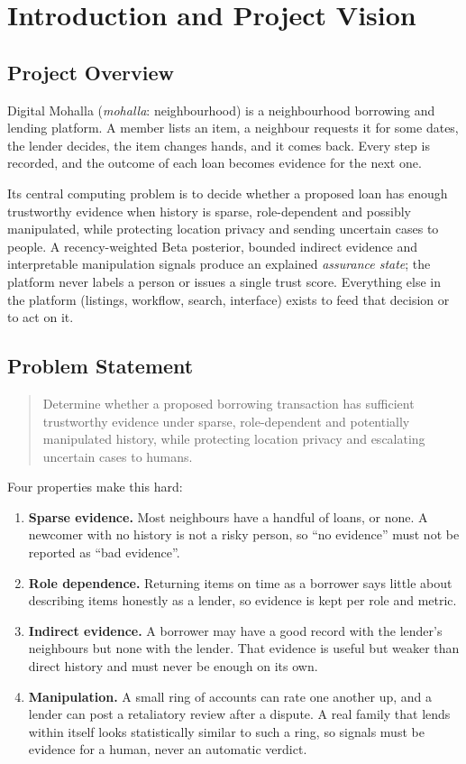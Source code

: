 \chapter{Introduction and Project Vision}\label{ch:introduction-project-vision}
\section{Project Overview}\label{sec:project-overview}
Digital Mohalla (\textit{mohalla}: neighbourhood) is a neighbourhood borrowing and lending platform. A member lists an item, a neighbour requests it for some dates, the lender decides, the item changes hands, and it comes back. Every step is recorded, and the outcome of each loan becomes evidence for the next one.

Its central computing problem is to decide whether a proposed loan has enough trustworthy evidence when history is sparse, role-dependent and possibly manipulated, while protecting location privacy and sending uncertain cases to people. A recency-weighted Beta posterior, bounded indirect evidence and interpretable manipulation signals produce an explained \textit{assurance state}; the platform never labels a person or issues a single trust score. Everything else in the platform (listings, workflow, search, interface) exists to feed that decision or to act on it.

\section{Problem Statement}\label{sec:problem-statement}
\begin{quote}
Determine whether a proposed borrowing transaction has sufficient trustworthy evidence under sparse, role-dependent and potentially manipulated history, while protecting location privacy and escalating uncertain cases to humans.
\end{quote}
Four properties make this hard:

\begin{enumerate}
\item \textbf{Sparse evidence.} Most neighbours have a handful of loans, or none. A newcomer with no history is not a risky person, so ``no evidence'' must not be reported as ``bad evidence''.
\item \textbf{Role dependence.} Returning items on time as a borrower says little about describing items honestly as a lender, so evidence is kept per role and metric.
\item \textbf{Indirect evidence.} A borrower may have a good record with the lender's neighbours but none with the lender. That evidence is useful but weaker than direct history and must never be enough on its own.
\item \textbf{Manipulation.} A small ring of accounts can rate one another up, and a lender can post a retaliatory review after a dispute. A real family that lends within itself looks statistically similar to such a ring, so signals must be evidence for a human, never an automatic verdict.
\end{enumerate}

